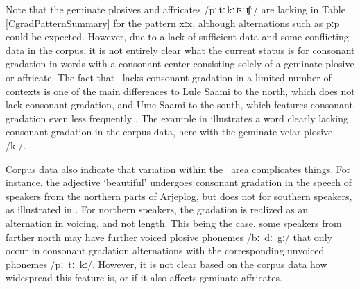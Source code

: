 Note that the geminate plosives and affricates \mbox{/pː\,tː\,kː\,ʦː\,ʧː/} are lacking in Table \vref{CgradPatternSummary} for the pattern \mbox{xː\Div x}, although alternations such as \mbox{pː\Div p} could be expected. However, due to a lack of sufficient data and some conflicting data in the corpus, it is not entirely clear what the current status is for consonant gradation in words with a consonant center consisting solely of a geminate plosive or affricate. The fact that \PS\ lacks consonant gradation in a limited number of contexts is one of the main differences to Lule Saami to the north, which does not lack consonant gradation, and Ume Saami to the south, which features consonant gradation even less frequently \citep[cf.][21-23]{Sammallahti1998}. 
The example in  illustrates a word clearly lacking consonant gradation in the corpus data, here with the geminate velar plosive /kː/. 
\ea\label{CgradEx4a}%
\z

Corpus data also indicate that variation within the \PS\ area complicates things. For instance, the adjective  ‘beautiful’ undergoes consonant gradation in the speech of speakers from the northern parts of Arjeplog, but does not for southern speakers, as illustrated in . For northern speakers, the gradation is realized as an alternation in voicing, and not length. 
\ea\label{CgradEx4b}%
\z
This being the case, some speakers from farther north may have further voiced plosive phonemes \mbox{/bː dː gː/} that only occur in consonant gradation alternations with the corresponding unvoiced phonemes \mbox{/pː tː kː/}. However, it is not clear based on the corpus data how widespread this feature is, or if it also affects geminate affricates. 

